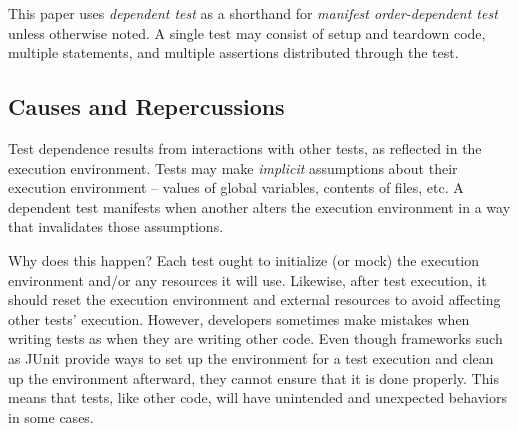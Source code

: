 This paper uses \textit{dependent test} as a shorthand for
\textit{manifest order-dependent test}
unless otherwise noted.
A single test may consist of setup and teardown
code, multiple statements, and multiple assertions
distributed through the test.




\subsection{Causes and Repercussions}
\label{sec:intro-repercussions}


Test dependence results from interactions with other tests,
as reflected in the execution environment.
Tests may make \textit{implicit} assumptions about their
execution environment -- values of global variables,
contents of files, etc. A dependent test
manifests when another alters the execution
environment in a way that invalidates those assumptions.


Why does this happen?
Each test ought to initialize (or mock) the execution environment
and/or any resources it will use.
Likewise, after test execution, it should reset the
execution environment and external resources
to avoid affecting other tests' execution.
However, developers sometimes
make mistakes when writing tests as when they are writing other code.
Even though frameworks such as
JUnit provide ways to set up the environment for a test execution and clean
up the environment afterward,
they cannot ensure that it is done
properly. This means that tests, like other code,
will have unintended and unexpected behaviors in some cases.



